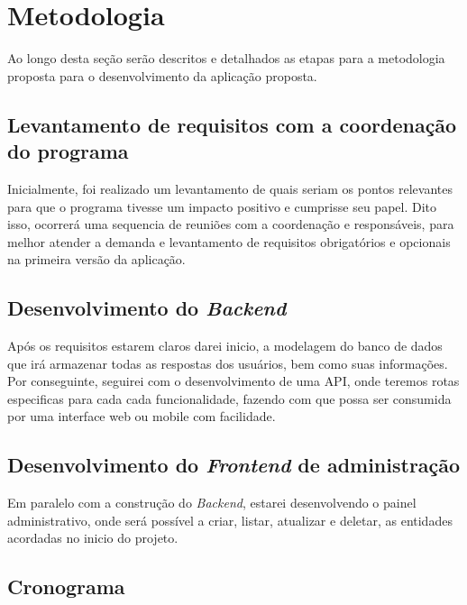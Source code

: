 \chapter{Metodologia}
\label{chap:metodologia}

Ao longo desta seção serão descritos e detalhados as etapas para a metodologia proposta para o desenvolvimento da aplicação proposta.

\section{Levantamento de requisitos com a coordenação do programa}
\label{sec:requisitos}
Inicialmente, foi realizado um levantamento de quais seriam os pontos relevantes para que o programa tivesse um impacto positivo e cumprisse seu papel. Dito isso, ocorrerá uma sequencia de reuniões com a coordenação e responsáveis, para melhor atender a demanda e levantamento de requisitos obrigatórios e opcionais na primeira versão da aplicação.
\section{Desenvolvimento do \textit{Backend}}
\label{sec:backend}
Após os requisitos estarem claros darei inicio, a modelagem do banco de dados que irá armazenar todas as respostas dos usuários, bem como suas informações. Por conseguinte, seguirei com o desenvolvimento de uma \gls{API}, onde teremos rotas especificas para cada cada funcionalidade, fazendo com que possa ser consumida por uma interface web ou mobile com facilidade.
\section{Desenvolvimento do \textit{Frontend} de administração}
\label{sec:frontend}
Em paralelo com a construção do \textit{Backend}, estarei desenvolvendo o painel administrativo, onde será possível a criar, listar, atualizar e deletar, as entidades acordadas no inicio do projeto.

\section{Cronograma}
\label{sec:cronograma}
 
\begin{table}[h!]
\end{table}

